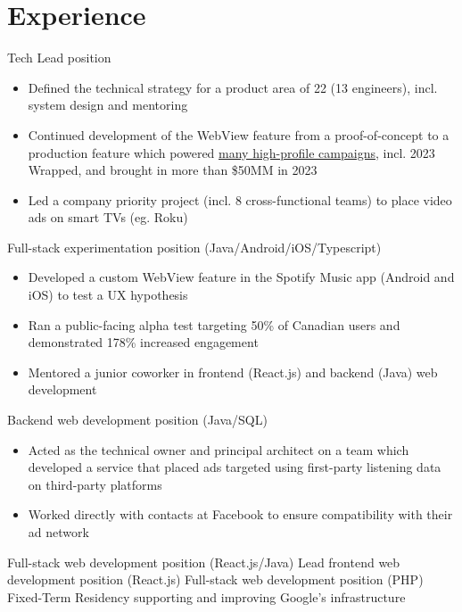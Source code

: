 \section{Experience}
	{Tech Lead position}{
	\begin{itemize}
	\item Defined the technical strategy for a product area of 22 (13 engineers), incl. system design and mentoring
	\item Continued development of the WebView feature from a proof-of-concept to a production feature which powered \textcolor{color1}{\href{https://newsroom.spotify.com/2023-10-18/spotifys-interactive-experiences-create-the-magic-of-wrapped-year-round/}{many high-profile campaigns}}, incl. 2023 Wrapped, and brought in more than \$50MM in 2023
	\item Led a company priority project (incl. 8 cross-functional teams) to place video ads on smart TVs (eg. Roku)
	\end{itemize}
	}
	{Full-stack experimentation position (Java/Android/iOS/Typescript)}{
	\begin{itemize}
	\item Developed a custom WebView feature in the Spotify Music app (Android and iOS) to test a UX hypothesis
	\item Ran a public-facing alpha test targeting 50\% of Canadian users and demonstrated 178\% increased engagement
	\item Mentored a junior coworker in frontend (React.js) and backend (Java) web development
	\end{itemize}
	}
	{Backend web development position (Java/SQL)}{
	\begin{itemize}
	\item Acted as the technical owner and principal architect on a team which developed a service that placed ads targeted using first-party listening data on third-party platforms
	\item Worked directly with contacts at Facebook to ensure compatibility with their ad network
	\end{itemize}
}

	{Full-stack web development position (React.js/Java)}{}
	{Lead frontend web development position (React.js)}{}
	{Full-stack web development position (PHP)}{}
	{Fixed-Term Residency supporting and improving Google's infrastructure}{}

